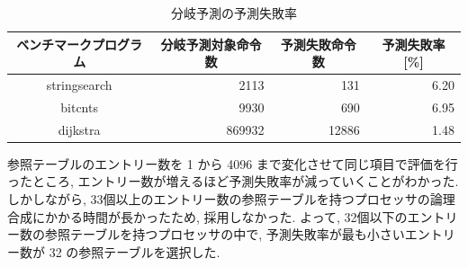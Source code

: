 \documentclass[../improvements.tex]{subflies}
\begin{document}
  \begin{table}[t]
    \centering
    \caption{分岐予測の予測失敗率}
    \label{table:miss-rate}
    \begin{tabular}{|c|r|r|r|}
    \hline
    ベンチマークプログラム & \multicolumn{1}{c|}{分岐予測対象命令数} & \multicolumn{1}{c|}{予測失敗命令数} & \multicolumn{1}{c|}{予測失敗率 {[}\%{]}} \\ \hline
    stringsearch & 2113 & 131 & 6.20 \\
    bitcnts & 9930 & 690 & 6.95 \\
    dijkstra & 869932 & 12886 & 1.48 \\ \hline
    \end{tabular}
  \end{table}

  参照テーブルのエントリー数を 1 から 4096 まで変化させて同じ項目で評価を行ったところ, 
  エントリー数が増えるほど予測失敗率が減っていくことがわかった.
  しかしながら, 33個以上のエントリー数の参照テーブルを持つプロセッサの論理合成にかかる時間が長かったため, 採用しなかった.
  よって, 32個以下のエントリー数の参照テーブルを持つプロセッサの中で, 
  予測失敗率が最も小さいエントリー数が 32 の参照テーブルを選択した.

\end{document}
